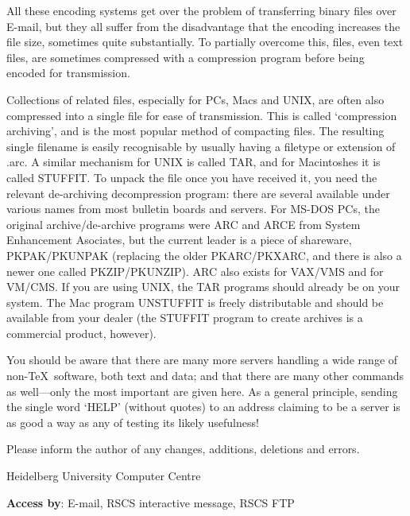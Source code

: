      All these encoding systems get over the problem of transferring
     binary files over E-mail, but they all suffer from the disadvantage
     that the encoding increases the file size, sometimes quite
     substantially. To partially overcome this, files, even text files,
     are sometimes compressed with a compression program before being
     encoded for transmission.

     Collections of related files, especially for PCs, Macs and UNIX,
     are often also compressed into a single file for ease of
     transmission. This is called `compression archiving', and is the
     most popular method of compacting files. The resulting single
     filename is easily recognisable by usually having a filetype or
     extension of {\tx .arc}. A similar mechanism for UNIX is called
     TAR, and for Macintoshes it is called STUFFIT. To unpack the file
     once you have received it, you need the relevant de-archiving
     decompression program: there are several available under various
     names from most bulletin boards and servers. For MS-DOS PCs, the
     original archive/de-archive programs were ARC and ARCE from System
     Enhancement Asociates, but the current leader is a piece of
     shareware, PKPAK/PKUNPAK (replacing the older PKARC/PKXARC, and
     there is also a newer one called PKZIP/PKUNZIP). ARC also exists
     for VAX/VMS and for VM/CMS. If you are using UNIX, the TAR programs
     should already be on your system. The Mac program UNSTUFFIT is
     freely distributable and should be available from your dealer (the
     STUFFIT program to create archives is a commercial product,
     however).


     You should be aware that there are many more servers handling a
     wide range of non-\TeX\ software, both text and data; and that
     there are many other commands as well---only the most important are
     given here. As a general principle, sending the single word
     `{\tx HELP}' (without quotes) to an address claiming to be a server
     is as good a way as any of testing its likely usefulness!

     Please inform the author of any changes, additions, deletions and
     errors.

 {Heidelberg University Computer Centre}

{\bf Access by}: E-mail, RSCS interactive message, RSCS FTP

